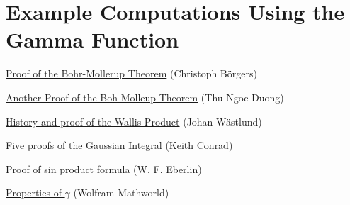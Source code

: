 \documentclass[openany, amssymb, psamsfonts]{amsart}
\theoremstyle{definition}
\numberwithin{equation}{section}
\begin{document}
    

\newpage
\section{Example Computations Using the Gamma Function}

    

\begin{thebibliography}{6}

    \href{https://christophborgers.com/bohr-mollerup-theorem}{Proof of the Bohr-Mollerup Theorem} (Christoph B\"{o}rgers)

    \href{https://dspace.mit.edu/bitstream/handle/1721.1/78574/18-100c-spring-2006/contents/projects/duong.pdf}{Another Proof of the Boh-Molleup Theorem} (Thu Ngoc Duong)

    \href{https://www.diva-portal.org/smash/get/diva2:375184/FULLTEXT01.pdf}{History and proof of the Wallis Product} (Johan W\"{a}stlund)

    \href{https://kconrad.math.uconn.edu/blurbs/analysis/gaussianintegral.pdf}{Five proofs of the Gaussian Integral} (Keith Conrad)

    \href{https://www.sciencedirect.com/science/article/pii/0022247X77902347?ref=pdf\_download\&fr=RR-2\&rr=8a870c785b50e21b}{Proof of sin product formula} (W. F. Eberlin)

    \href{https://mathworld.wolfram.com/Euler-MascheroniConstant.html}{Properties of $\gamma$} (Wolfram Mathworld)

\end{thebibliography}
\end{document}
